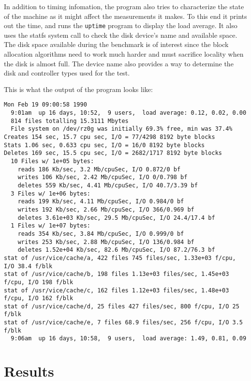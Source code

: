 In addition to timing infomation, the program also tries to
characterize the state of the machine as it might affect the
measurements it makes.  To this end it prints out the time, and runs the
{\tt uptime} program to display the load average.  It also uses the
statfs system call to check the disk device's name and available space.  The
disk space available during the benchmark is of interest since the block
allocation algorithms need to work much harder and must sacrifice
locality when the disk is almost full.  The device name also provides a
way to determine the disk and controller types used for the test.

This is what the output of the program looks like:
\begin{verbatim}
Mon Feb 19 09:00:58 1990
  9:01am  up 16 days, 10:52,  9 users,  load average: 0.12, 0.02, 0.00
  814 files totalling 15.3111 Mbytes
  File system on /dev/rz0g was initially 69.3% free, min was 37.4%
Creates 154 sec, 15.7 cpu sec, I/O = 77/4298 8192 byte blocks
Stats 1.06 sec, 0.633 cpu sec, I/O = 16/0 8192 byte blocks
Deletes 169 sec, 15.5 cpu sec, I/O = 2682/1717 8192 byte blocks
  10 Files w/ 1e+05 bytes:
    reads 186 Kb/sec, 3.2 Mb/cpuSec, I/O 0.872/0 bf
    writes 106 Kb/sec, 2.42 Mb/cpuSec, I/O 0/0.798 bf
    deletes 559 Kb/sec, 4.41 Mb/cpuSec, I/O 40.7/3.39 bf
  3 Files w/ 1e+06 bytes:
    reads 199 Kb/sec, 4.11 Mb/cpuSec, I/O 0.984/0 bf
    writes 192 Kb/sec, 2.66 Mb/cpuSec, I/O 366/0.969 bf
    deletes 3.61e+03 Kb/sec, 29.5 Mb/cpuSec, I/O 24.4/17.4 bf
  1 Files w/ 1e+07 bytes:
    reads 354 Kb/sec, 3.84 Mb/cpuSec, I/O 0.999/0 bf
    writes 253 Kb/sec, 2.88 Mb/cpuSec, I/O 136/0.984 bf
    deletes 1.52e+04 Kb/sec, 82.6 Mb/cpuSec, I/O 87.2/76.3 bf
stat of /usr/vice/cache/a, 422 files 745 files/sec, 1.33e+03 f/cpu, I/O 38.4 f/blk 
stat of /usr/vice/cache/b, 198 files 1.13e+03 files/sec, 1.45e+03 f/cpu, I/O 198 f/blk 
stat of /usr/vice/cache/c, 162 files 1.12e+03 files/sec, 1.48e+03 f/cpu, I/O 162 f/blk 
stat of /usr/vice/cache/d, 25 files 427 files/sec, 800 f/cpu, I/O 25 f/blk 
stat of /usr/vice/cache/e, 7 files 68.9 files/sec, 256 f/cpu, I/O 3.5 f/blk 
  9:06am  up 16 days, 10:58,  9 users,  load average: 1.49, 0.81, 0.09
\end{verbatim}

\section{Results}

